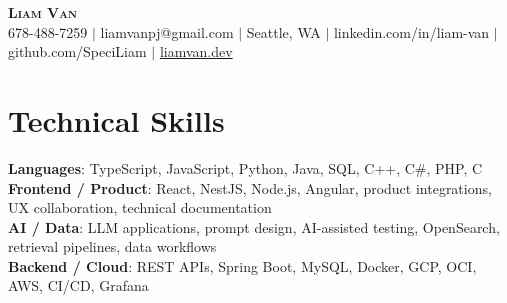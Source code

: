 \documentclass[letterpaper,11pt]{article}
\begin{document}

%
\begin{center}
    \textbf{\Huge \scshape Liam Van} \\ \vspace{1pt}
    \small 678-488-7259 $|$ \small {liamvanpj@gmail.com} $|$ Seattle, WA
 {{$|$ linkedin.com/in/liam-van} {$|$ github.com/SpeciLiam} {$|$ \href{https://liamvan.dev}{liamvan.dev}}}

\end{center}

\section{Technical Skills}
 \begin{itemize}[leftmargin=0.15in, label={}]
    \small{\item{
     \textbf{Languages}{: TypeScript, JavaScript, Python, Java, SQL, C++, C\#, PHP, C} \\
     \textbf{Frontend / Product}{: React, NestJS, Node.js, Angular, product integrations, UX collaboration, technical documentation} \\
     \textbf{AI / Data}{: LLM applications, prompt design, AI-assisted testing, OpenSearch, retrieval pipelines, data workflows} \\
     \textbf{Backend / Cloud}{: REST APIs, Spring Boot, MySQL, Docker, GCP, OCI, AWS, CI/CD, Grafana} \\
    }}
 \end{itemize}
%

\end{document}
